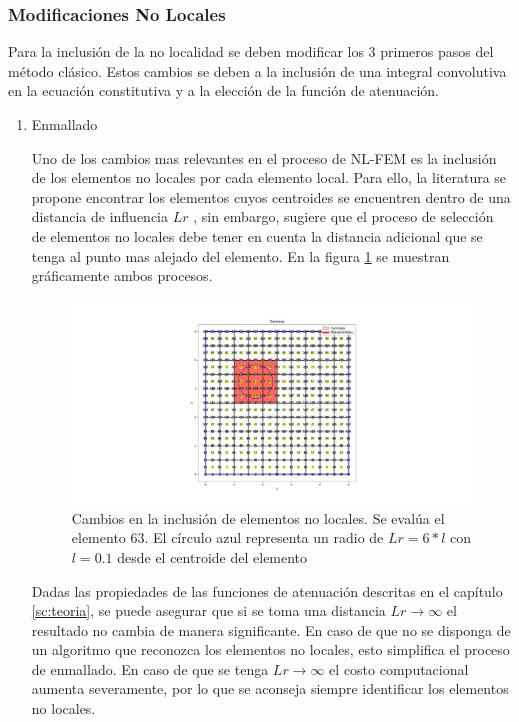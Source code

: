 		\subsubsection{Modificaciones No Locales}
		Para la inclusión de la no localidad se deben modificar los 3 primeros pasos del método clásico. Estos cambios se deben a la inclusión de una integral convolutiva en la ecuación constitutiva y a la elección de la función de atenuación.
			\begin{enumerate}
				\item Enmallado

				Uno de los cambios mas relevantes en el proceso de NL-FEM es la inclusión de los elementos no locales por cada elemento local. Para ello, la literatura se propone encontrar los elementos cuyos centroides se encuentren dentro de una distancia de influencia $Lr$ \parencite{article}, sin embargo, \textcite{ProgramaEnmallado} sugiere que el proceso de selección de elementos no locales debe tener en cuenta la distancia adicional que se tenga al punto mas alejado del elemento. En la figura \ref{fig:nolocales_lr_cambios} se muestran gráficamente ambos procesos.

				\begin{figure}
					\centering
					\sffamily
					\includegraphics[width=\textwidth]{figuras/diferenciasLr.pdf}
					\caption{Cambios en la inclusión de elementos no locales. Se evalúa el elemento 63. El círculo azul representa un radio de $Lr=6*l$ con $l=0.1$ desde el centroide del elemento}
					\label{fig:nolocales_lr_cambios}
				\end{figure}

				Dadas las propiedades de las funciones de atenuación descritas en el capítulo \ref{sc:teoria}, se puede asegurar que si se toma una distancia $Lr\rightarrow\infty$ el resultado no cambia de manera significante. En caso de que no se disponga de un algoritmo que reconozca los elementos no locales, esto simplifica el proceso de enmallado. En caso de que se tenga $Lr\rightarrow\infty$ el costo computacional aumenta severamente, por lo que se aconseja siempre identificar los elementos no locales.


\end{enumerate}
